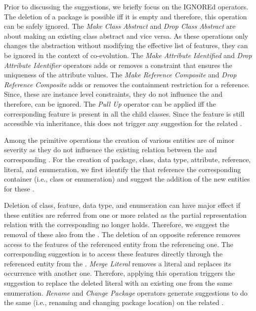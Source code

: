 Prior to discussing the suggestions, we briefly focus on the \textsf{IGNORE}d operators. The deletion of a package is possible iff it is empty and therefore, this operation can be safely ignored. The \textit{Make Class Abstract} and \textit{Drop Class Abstract} are about making an existing class abstract and vice versa. As these operations only changes the abstraction without modifying the effective list of features, they can be ignored in the context of \viewtype co-evolution. The \textit{Make Attribute Identified} and \textit{Drop Attribute Identifier} operators adds or removes a constraint that ensures the uniqueness of the attribute values. The \textit{Make Reference Composite} and \textit{Drop Reference Composite} adds or removes the containment restriction for a reference. Since, these are instance level constraints, they do not influence the \viewtype and therefore, can be ignored. The \textit{Pull Up} operator can be applied iff the corresponding feature is present in all the child classes. Since the feature is still accessible via inheritance, this does not trigger any suggestion for the related \viewtypes.

Among the primitive operations the creation of various entities are of minor severity as they do not influence the existing relation between the \metamodel and corresponding \viewtypes. For the creation of package, class, data type, attribute, reference, literal, and enumeration, we first identify the \viewtypes that reference the corresponding container (i.e., class or enumeration) and suggest the addition of the new entities for these \viewtypes.

Deletion of class, feature, data type, and enumeration can have major effect if these entities are referred from one or more related \viewtypes as the partial representation relation with the corresponding \metamodel no longer holds. Therefore, we suggest the removal of these also from the \viewtypes. The deletion of an opposite reference removes access to the features of the referenced entity from the referencing one. The corresponding suggestion is to access these features directly through the referenced entity from the \viewtype. \textit{Merge Literal} removes a literal and replaces its occurrence with another one. Therefore, applying this operation triggers the suggestion to replace the deleted literal with an existing one from the same enumeration. \textit{Rename} and \textit{Change Package} operators generate suggestions to do the same (i.e., renaming and changing package location) on the related \viewtypes.

